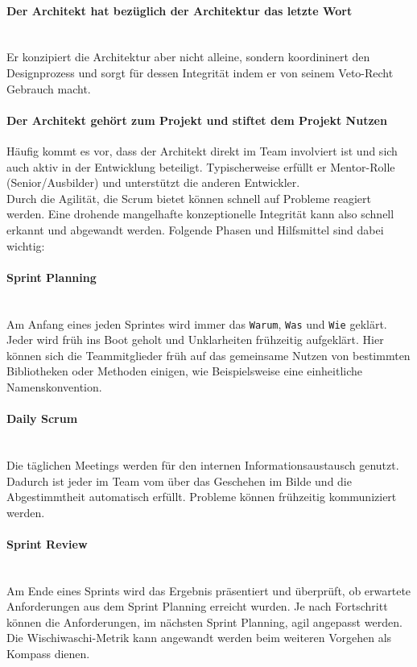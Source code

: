 \documentclass[a4paper, ngerman, 12pt, usenames, dvipsnames]{article}
\begin{document}
    \paragraph{Der Architekt hat bezüglich der Architektur das letzte Wort}\mbox{} \\
    Er konzipiert die Architektur aber nicht alleine, sondern koordininert den Designprozess und sorgt für dessen Integrität indem er von seinem Veto-Recht Gebrauch macht. 
    
    \paragraph{Der Architekt gehört zum Projekt und stiftet dem Projekt Nutzen}\mbox{} 
    Häufig kommt es vor, dass der Architekt direkt im Team involviert ist und sich auch aktiv in der Entwicklung beteiligt.
    Typischerweise erfüllt er Mentor-Rolle (Senior/Ausbilder) und unterstützt die anderen Entwickler.\\
    
    Durch die Agilität, die Scrum bietet können schnell auf Probleme reagiert werden. Eine drohende mangelhafte konzeptionelle Integrität kann also schnell erkannt und abgewandt werden.
    Folgende Phasen und Hilfsmittel sind dabei wichtig:

    \paragraph{Sprint Planning}\mbox{} \\
    Am Anfang eines jeden Sprintes wird immer das \texttt{Warum}, \texttt{Was} und \texttt{Wie} geklärt. 
    Jeder wird früh ins Boot geholt und Unklarheiten frühzeitig aufgeklärt.
    Hier können sich die Teammitglieder früh auf das gemeinsame Nutzen von bestimmten Bibliotheken oder Methoden einigen, wie Beispielsweise eine einheitliche Namenskonvention.
    \paragraph{Daily Scrum}\mbox{} \\
    Die täglichen Meetings werden für den internen Informationsaustausch genutzt.
    Dadurch ist jeder im Team vom über das Geschehen im Bilde und die Abgestimmtheit automatisch erfüllt.
    Probleme können frühzeitig kommuniziert werden.
    \paragraph{Sprint Review}\mbox{} \\
    Am Ende eines Sprints wird das Ergebnis präsentiert und überprüft, ob erwartete Anforderungen aus dem Sprint Planning erreicht wurden.
    Je nach Fortschritt können die Anforderungen, im nächsten Sprint Planning, agil angepasst werden. Die Wischiwaschi-Metrik kann angewandt werden beim weiteren Vorgehen als Kompass dienen.
\end{document}
